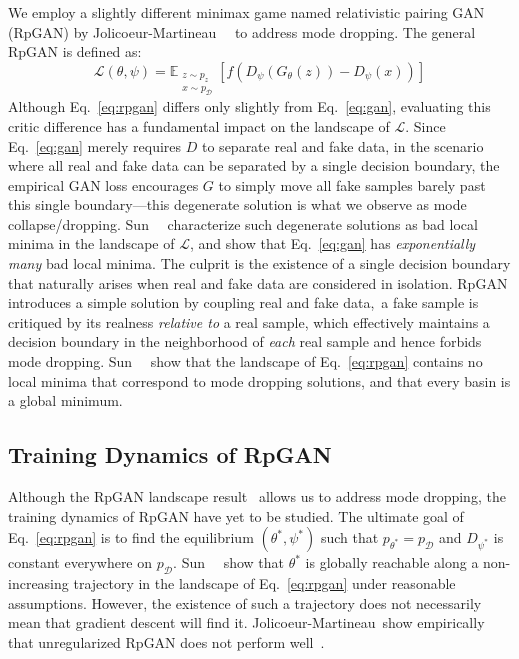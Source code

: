 We employ a slightly different minimax game named relativistic pairing GAN (RpGAN) by Jolicoeur-Martineau~\etal~\cite{rgan} to address mode dropping. The general RpGAN is defined as:
\begin{equation}
\label{eq:rpgan}
\mathcal{L}(\theta,\psi)=\mathbb{E}_{\substack{z\sim p_z\\x\sim p_\mathcal{D}}}\left[f\left(  D_\psi(G_\theta(z))-D_\psi(x) \right)\right]
\end{equation}
Although Eq.~\ref{eq:rpgan} differs only slightly from Eq.~\ref{eq:gan}, evaluating this critic difference has a fundamental impact on the landscape of $\mathcal{L}$. Since Eq.~\ref{eq:gan} merely requires $D$ to separate real and fake data, in the scenario where all real and fake data can be separated by a single decision boundary, the empirical GAN loss encourages $G$ to simply move all fake samples barely past this single boundary---this degenerate solution is what we observe as mode collapse/dropping. Sun~\etal~\cite{rpgan} characterize such degenerate solutions as bad local minima in the landscape of $\mathcal{L}$, and show that Eq.~\ref{eq:gan} has \emph{exponentially many} bad local minima. The culprit is the existence of a single decision boundary that naturally arises when real and fake data are considered in isolation. RpGAN introduces a simple solution by coupling real and fake data,~\ie a fake sample is critiqued by its realness \emph{relative to} a real sample, which effectively maintains a decision boundary in the neighborhood of \emph{each} real sample and hence forbids mode dropping. Sun~\etal~\cite{rpgan} show that the landscape of Eq.~\ref{eq:rpgan} contains no local minima that correspond to mode dropping solutions, and that every basin is a global minimum.


\subsection{Training Dynamics of RpGAN}
Although the RpGAN landscape result~\cite{rpgan} allows us to address mode dropping, the training dynamics of RpGAN have yet to be studied. The ultimate goal of Eq.~\ref{eq:rpgan} is to find the equilibrium $(\theta^*,\psi^*)$ such that $p_{\theta^*}=p_\mathcal{D}$ and $D_{\psi^*}$ is constant everywhere on $p_\mathcal{D}$. Sun~\etal~\cite{rpgan} show that $\theta^*$ is globally reachable along a non-increasing trajectory in the landscape of Eq.~\ref{eq:rpgan} under reasonable assumptions. However, the existence of such a trajectory does not necessarily mean that gradient descent will find it. Jolicoeur-Martineau~\etal show empirically that unregularized RpGAN does not perform well~\cite{rgan}. 

